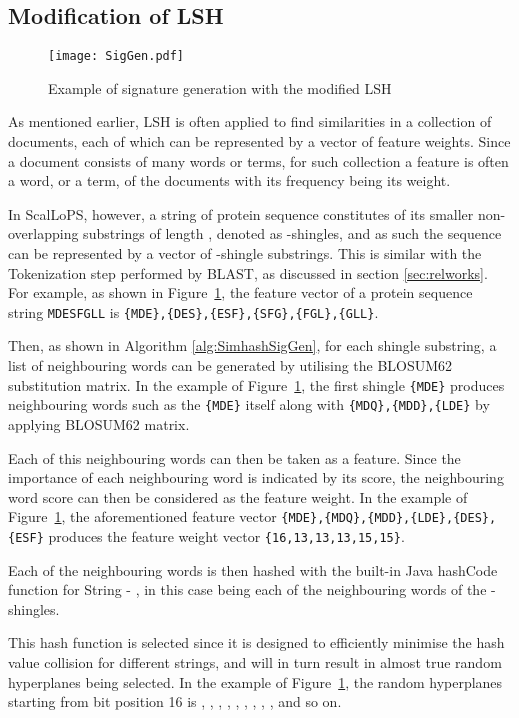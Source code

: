 \documentclass[titlepage]{csetr}
\begin{document}
\subsection{Modification of LSH}

\begin{figure}[t]
\centering
       {\texttt{[image: SigGen.pdf]}}
 \caption{Example of signature generation with the modified LSH}
 \label{fig:SimhashSigGen}
\end{figure}

As mentioned earlier, LSH is often applied to find similarities in a collection of documents, each of which can be represented by a vector of feature weights. Since a document consists of many words or terms, for such collection a feature is often a word, or a term, of the documents with its frequency being its weight.

In ScalLoPS, however, a string of protein sequence constitutes of its smaller non-overlapping substrings of length , denoted as -shingles, and as such the sequence can be represented by a vector of -shingle substrings. This is similar with the Tokenization step performed by BLAST, as discussed in section \ref{sec:relworks}. For example, as shown in Figure~\ref{fig:SimhashSigGen}, the feature vector of a protein sequence string \texttt{MDESFGLL} is \texttt{\{MDE\},\{DES\},\{ESF\},\{SFG\},\{FGL\},\{GLL\}}.

Then, as shown in Algorithm \ref{alg:SimhashSigGen}, for each shingle substring, a list of neighbouring words can be generated by utilising the BLOSUM62 substitution matrix. In the example of Figure~\ref{fig:SimhashSigGen}, the first shingle \texttt{\{MDE\}} produces neighbouring words such as the \texttt{\{MDE\}} itself along with \texttt{\{MDQ\},\{MDD\},\{LDE\}} by applying BLOSUM62 matrix.

Each of this neighbouring words can then be taken as a feature. Since the importance of each neighbouring word is indicated by its score, the neighbouring word score can then be considered as the feature weight. In the example of Figure~\ref{fig:SimhashSigGen}, the aforementioned feature vector \texttt{\{MDE\},\{MDQ\},\{MDD\},\{LDE\},\{DES\},\{ESF\}} produces the feature weight vector \texttt{\{16,13,13,13,15,15\}}.

Each of the neighbouring words is then hashed with the built-in Java hashCode function for String - 
,  in this case being each of the neighbouring words of the -shingles.

This hash function is selected since it is designed to efficiently minimise the hash value collision for different strings, and will in turn result in almost true random hyperplanes being selected. In the example of Figure~\ref{fig:SimhashSigGen}, the random hyperplanes starting from bit position 16 is , , , , , , , , , and so on.
\end{document}
